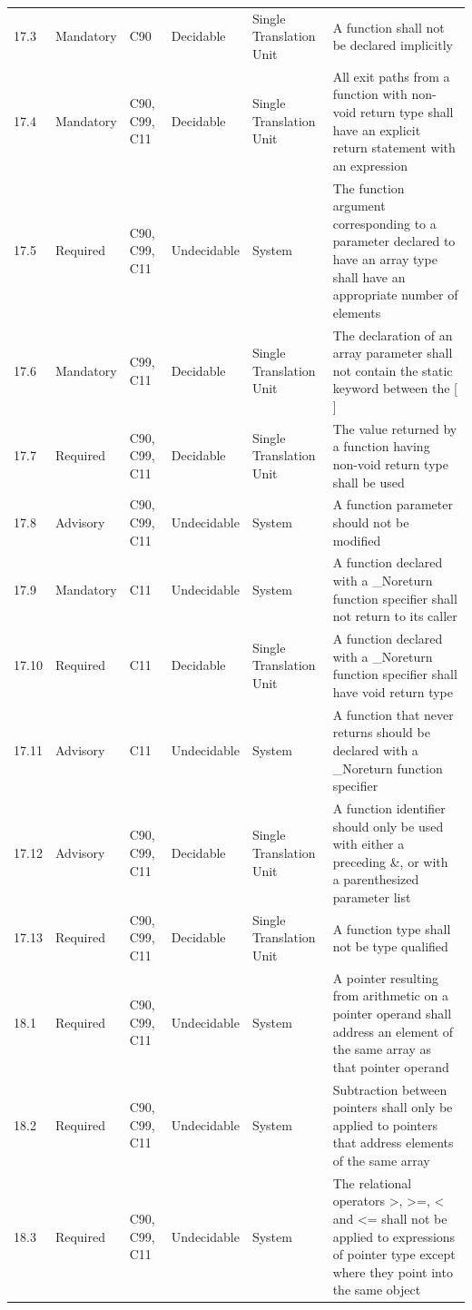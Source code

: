 \documentclass[11pt]{article}
\begin{document}
{\begin{longtable}{@{}p{1.0cm}p{1.6cm}p{1.8cm}p{2.0cm}p{1.6cm}p{7.4cm}@{}}
17.3 & Mandatory & C90 & Decidable & Single Translation Unit & A function shall not be declared implicitly \\
17.4 & Mandatory & C90, C99, C11 & Decidable & Single Translation Unit & All exit paths from a function with non-void return type shall have an explicit return statement with an expression \\
17.5 & Required & C90, C99, C11 & Undecidable & System & The function argument corresponding to a parameter declared to have an array type shall have an appropriate number of elements \\
17.6 & Mandatory & C99, C11 & Decidable & Single Translation Unit & The declaration of an array parameter shall not contain the static keyword between the [ ] \\
17.7 & Required & C90, C99, C11 & Decidable & Single Translation Unit & The value returned by a function having non-void return type shall be used \\
17.8 & Advisory & C90, C99, C11 & Undecidable & System & A function parameter should not be modified \\
17.9 & Mandatory & C11 & Undecidable & System & A function declared with a \_Noreturn function specifier shall not return to its caller \\
17.10 & Required & C11 & Decidable & Single Translation Unit & A function declared with a \_Noreturn function specifier shall have void return type \\
17.11 & Advisory & C11 & Undecidable & System & A function that never returns should be declared with a \_Noreturn function specifier \\
17.12 & Advisory & C90, C99, C11 & Decidable & Single Translation Unit & A function identifier should only be used with either a preceding \&, or with a parenthesized parameter list \\
17.13 & Required & C90, C99, C11 & Decidable & Single Translation Unit & A function type shall not be type qualified \\
18.1 & Required & C90, C99, C11 & Undecidable & System & A pointer resulting from arithmetic on a pointer operand shall address an element of the same array as that pointer operand \\
18.2 & Required & C90, C99, C11 & Undecidable & System & Subtraction between pointers shall only be applied to pointers that address elements of the same array \\
18.3 & Required & C90, C99, C11 & Undecidable & System & The relational operators >, >=, < and <= shall not be applied to expressions of pointer type except where they point into the same object \\

\end{longtable}}
\end{document}
